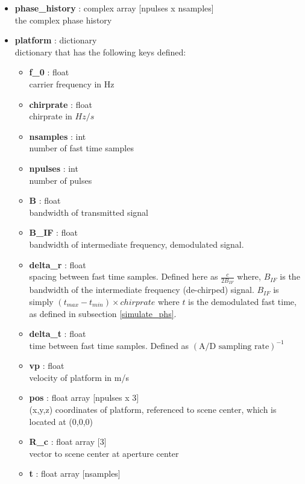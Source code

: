 \documentclass{article}
\newcommand{\defs}[2]{\textbf{{#1}} : {#2}}
\begin{document}
\begin{itemize}
	\item \defs{phase\_history}{complex array [npulses x nsamples]}\\
		the complex phase history
	  \item \defs{platform}{dictionary}\\
	  	dictionary that has the following keys defined:
	  \begin{itemize}
	    \item \defs{f\_0}{float}\\
	    	carrier frequency in Hz
		\item \defs{chirprate}{float}\\
		   	chirprate in $Hz/s$
	    \item \defs{nsamples}{int}\\
	    	number of fast time samples
	    \item \defs{npulses}{int}\\
	    	number of pulses
	    \item \defs{B}{float}\\
	    	bandwidth of transmitted signal
	    \item \defs{B\_IF}{float}\\
	    	bandwidth of intermediate frequency, demodulated signal.
	    \item \defs{delta\_r}{float}\\
       	   	spacing between fast time samples.  Defined here as $\frac{c}{2B_{IF}}$ where, $B_{IF}$ is the bandwidth of the intermediate frequency (de-chirped) signal.  $B_{IF}$ is simply $(t_{max}-t_{min})\times chirprate$ where $t$ is the demodulated fast time, as defined in subsection \ref{simulate_phs}.
    	\item \defs{delta\_t}{float}\\
    		time between fast time samples.  Defined as $(\mbox{A/D sampling rate})^{-1}$
    	\item \defs{vp}{float}\\
	   		velocity of platform in m/s
	   	\item \defs{pos}{float array [npulses x 3]}\\
	       	(x,y,z) coordinates of platform, referenced to scene center, which is located at (0,0,0)
	    \item \defs{R\_c}{float array [3]}\\
	     	vector to scene center at aperture center
	    \item \defs{t}{float array [nsamples]}\\

\end{itemize}
\end{itemize}
\end{document}
